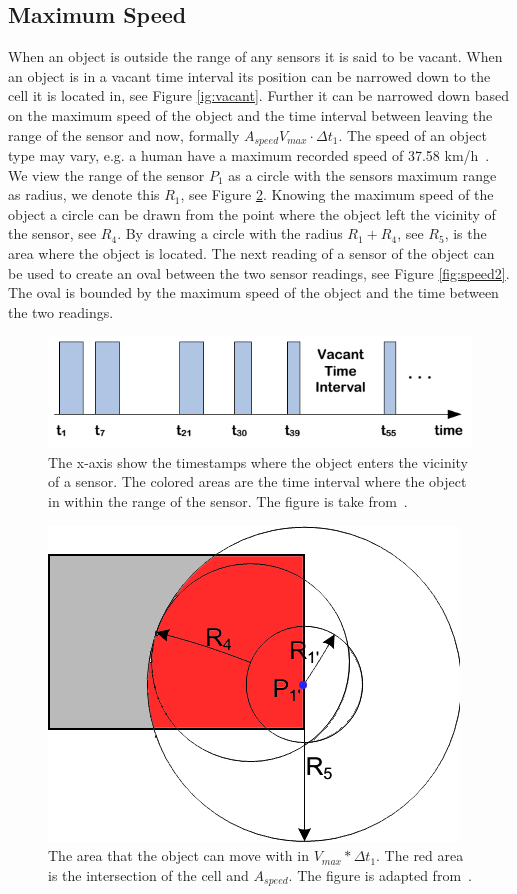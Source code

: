 \subsection{Maximum Speed}
\label{sec:speed}
When an object is outside the range of any sensors it is said to be vacant.
When an object is in a vacant time interval its position can be narrowed down to the cell it is located in, see Figure \ref{ig:vacant}. 
Further it can be narrowed down based on the maximum speed of the object and the time interval between leaving the range of the sensor and now, formally $A_{speed} V_{max}\cdot\Delta t_1$. 
The speed of an object type may vary, e.g. a human have a maximum recorded speed of 37.58 km/h~\cite{bolt}.
We view the range of the sensor $P_1$ as a circle with the sensors maximum range as radius, we denote this $R_1$, see Figure \ref{fig:speed1}.
Knowing the maximum speed of the object a circle can be drawn from the point where the object left the vicinity of the sensor, see $R_4$.
By drawing a circle with the radius $R_1 + R_4$, see $R_5$, is the area where the object is located. 
The next reading of a sensor of the object can be used to create an oval between the two sensor readings, see Figure \ref{fig:speed2}.  
The oval is bounded by the maximum speed of the object and the time between the two readings. 

\begin{figure}%
\centering
\includegraphics[width=\columnwidth]{images/vacant.png}%
\caption{The x-axis show the timestamps where the object enters the vicinity of a sensor. The colored areas are the time interval where the object in within the range of the sensor. The figure is take from~\cite{Jensen:2009:GMB:1590953.1591000}.}%
\label{fig:vacant}%
\end{figure}

\begin{figure}%
\centering
\includegraphics[width=0.5\columnwidth]{images/speed.png}%
\caption{The area that the object can move with in $V_{max}*\Delta t_1$. The red area is the intersection of the cell and $A_{speed}$. The figure is adapted from~\cite{Jensen:2009:GMB:1590953.1591000}.}%
\label{fig:speed1}%
\end{figure}

